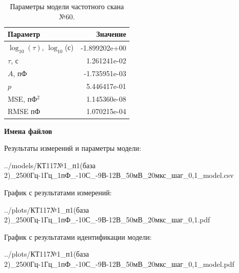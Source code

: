 \begin{table}[!ht]
    \centering
    \caption{Параметры модели частотного скана №60.}
    \begin{tabular}{|l|r|}
        \hline
        Параметр                                       & Значение                  \\ \hline
        $\log_{10}(\tau)$, $\log_{10}$(с)              & -1.899202e+00             \\ \hline
        $\tau$, с                                      & 1.261241e-02              \\ \hline
        $A$, пФ                                        & -1.735951e-03             \\ \hline
        $p$                                            & 5.446417e-01              \\ \hline
        MSE, пФ$^2$                                    & 1.145360e-08              \\ \hline
        RMSE пФ                                        & 1.070215e-04              \\ \hline
    \end{tabular}
    \label{table:frequency_scan_model_60}
\end{table}

\textbf{Имена файлов}

Результаты измерений и параметры модели:

\scriptsize../models/КТ117№1\_п1(база 2)\_2500Гц-1Гц\_1пФ\_-10С\_-9В-12В\_50мВ\_20мкс\_шаг\_0,1\_model.csv
\normalsize

График с результатами измерений:

\scriptsize../plots/КТ117№1\_п1(база 2)\_2500Гц-1Гц\_1пФ\_-10С\_-9В-12В\_50мВ\_20мкс\_шаг\_0,1.pdf
\normalsize

График с результатами идентификации модели:

\scriptsize../plots/КТ117№1\_п1(база 2)\_2500Гц-1Гц\_1пФ\_-10С\_-9В-12В\_50мВ\_20мкс\_шаг\_0,1\_model.pdf
\normalsize

